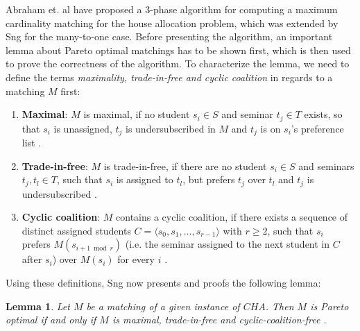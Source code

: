 Abraham et. al \cite{Abraham:Pacha} have proposed a 3-phase algorithm for computing a maximum cardinality matching for the house allocation problem, which was extended by Sng \cite{SngThesis} for the many-to-one case. Before presenting the algorithm, an important lemma about Pareto optimal matchings has to be shown first, which is then used to prove the correctness of the algorithm. To characterize the lemma, we need to define the terms \emph{maximality, trade-in-free and cyclic coalition} in regards to a matching $M$ first: 
\begin{enumerate}
    \item \textbf{Maximal}: $M$ is maximal, if no student $s_i \in S$ and seminar $t_j \in T$ exists, so that $s_i$ is unassigned, $t_j$ is undersubscribed in $M$ and $t_j$ is on $s_i$'s preference list \cite{Abraham:Pacha}.
    \item \textbf{Trade-in-free}: $M$ is trade-in-free, if there are no student $s_i \in S$ and seminars $t_j, t_l \in T$, such that $s_i$ is assigned to $t_l$, but prefers $t_j$ over $t_l$ and $t_j$ is undersubscribed \cite{Abraham:Pacha}. 
    \item \textbf{Cyclic coalition}: $M$ contains a cyclic coalition, if there exists a sequence of distinct assigned students $C = \langle s_0, s_1, \dots, s_{r-1} \rangle$ with $r \geq 2$, such that $s_i$ prefers $M(s_{i + 1 \bmod r})$ (i.e. the seminar assigned to the next student in $C$ after $s_i$) over $M(s_i)$ for every $i$ \cite{Abraham:Pacha}.
\end{enumerate}
Using these definitions, Sng now presents and proofs the following lemma:
\newtheorem{lemma}[theorem]{Lemma}
\begin{lemma}\label{lemma-pacha}
    Let $M$ be a matching of a given instance of $CHA$. Then $M$ is Pareto optimal if and only if $M$ is maximal, trade-in-free and cyclic-coalition-free \cite{Abraham:Pacha}.
\end{lemma}

